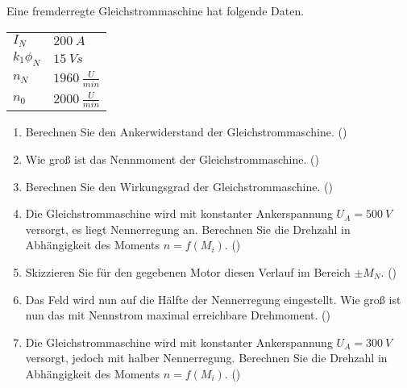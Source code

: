 \begin{question}[topic=gsm,type=exam,tags={20131203}]
Eine fremderregte Gleichstrommaschine hat folgende Daten.\\
\begin{tabular}{L{2cm}l}
$I_{N}$ \dotfill &$200~A$\\
$k_1 \phi_N$ \dotfill & $15~Vs$ \\
$n_N$ \dotfill & $1960~\frac{U}{min}$\\
$n_0$ \dotfill & $2000~\frac{U}{min}$
\end{tabular}
\begin{enumerate}
\item Berechnen Sie den Ankerwiderstand der Gleichstrommaschine. ()
\item Wie groß ist das Nennmoment der Gleichstrommaschine. ()
\item Berechnen Sie den Wirkungsgrad der Gleichstrommaschine. ()
\item Die Gleichstrommaschine wird mit konstanter Ankerspannung $U_A = 500~V$ versorgt, es liegt Nennerregung an. Berechnen Sie die Drehzahl in Abhängigkeit des Moments $n=f(M_i)$. ()
\item Skizzieren Sie für den gegebenen Motor diesen Verlauf im Bereich $\pm M_N$. ()
\item Das Feld wird nun auf die Hälfte der Nennerregung eingestellt. Wie groß ist nun das mit Nennstrom maximal erreichbare Drehmoment. ()
\item Die Gleichstrommaschine wird mit konstanter Ankerspannung $U_A = 300~V$ versorgt, jedoch mit halber Nennerregung. Berechnen Sie die Drehzahl in Abhängigkeit des Moments $n=f(M_i)$. ()
\end{enumerate}
\end{question}
